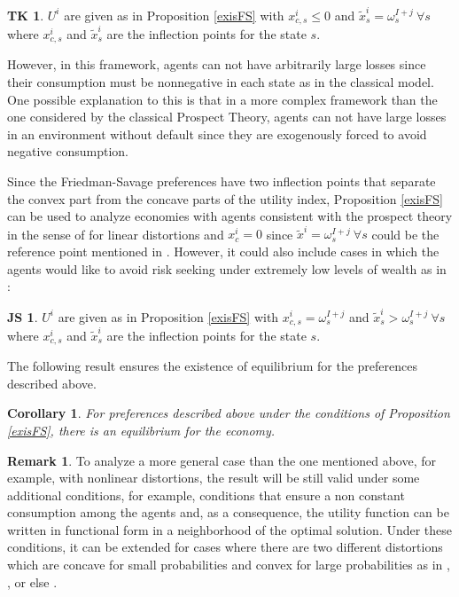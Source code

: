 \documentclass[pdftex]{article}
\numberwithin{equation}{section}
\theoremstyle{th}
\newtheorem{cor}{{Corollary}}%
\newtheorem{proof lemma}{{Proof Lemma}.}
\theoremstyle{definition}
\newtheorem*{TK}{TK\hspace{-0.15cm}}
\newtheorem*{JS}{JS\hspace{-0.15cm}}
\newtheorem{remark}{Remark}%
\newtheorem*{risk lovers}{Risk lovers}
\newtheorem*{risk averse}{Risk averse}
\begin{document}
\begin{TK}$U^i$ are given as in Proposition \ref{exisFS} with $x^i_{c,s}\leq0$ and $\tilde{x}^i_s=\omega^{I+j}_s\ \forall{s}$ where $x^i_{c,s}$ and $\tilde{x}^i_s$ are the inflection points for the state $s$.
\end{TK}
However, in this framework, agents can not have arbitrarily large losses since their consumption must be nonnegative in each state as in the classical model. One possible explanation to this is that in a more complex framework than the one considered by the classical Prospect Theory, agents can not have large losses in an environment without default since they are exogenously forced to avoid negative consumption.



{Since the Friedman-Savage preferences have two inflection points that separate the convex part from the concave parts of the utility index, Proposition \ref{exisFS} can be used to analyze economies with agents consistent with the prospect theory in the sense of \cite{KT92} for linear distortions and $x^i_c=0$ since $\tilde{x}^i=\omega^{I+j}_s\ \forall{s}$ could be the reference point mentioned in \cite{KT}. However, it could also include cases in which the agents would like to avoid risk seeking under extremely low levels of wealth as in \cite{JS}:
\begin{JS}
$U^i$ are given as in Proposition \ref{exisFS} with $x^i_{c,s}=\omega^{I+j}_s$ and $\tilde{x}^i_s>\omega^{I+j}_s\ \forall{s}$ where $x^i_{c,s}$ and $\tilde{x}^i_s$ are the inflection points for the state $s$.
\end{JS}


The following result ensures the existence of equilibrium for the preferences described above.


\begin{cor}
\label{corollary}
{For preferences described above under the conditions of Proposition \ref{exisFS}, there is an equilibrium for the economy.}
\end{cor}


\begin{remark}
{To analyze a more general case than the one mentioned above, for example, with nonlinear distortions, the result will be still valid under some additional conditions, for example, conditions that ensure a non constant consumption among the agents and, as a consequence, the utility function can be written in functional form in a neighborhood of the optimal solution. Under these conditions, it can be extended for cases where there are two different distortions which are concave for small probabilities and convex for large probabilities as in \cite{KT92}, \cite{ABW}, \cite{Wakker} or else \cite{JS}.}
\end{remark}

}
\end{document}

